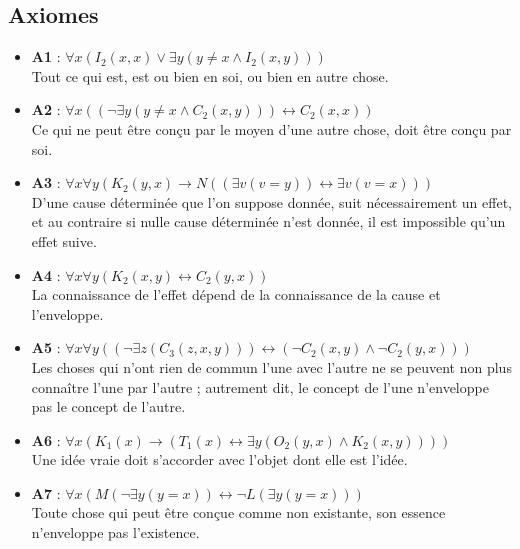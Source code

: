 \documentclass[10pt,a3paper]{article}
\begin{document}
\subsection{Axiomes}
\begin{itemize}
    \item \textbf{A1} : $\forall x (I_2(x,x) \lor \exists y (y \neq x \land I_2(x,y)))$ \\
    Tout ce qui est, est ou bien en soi, ou bien en autre chose.
    
    \item \textbf{A2} : $\forall x ((\neg \exists y (y \neq x \land C_2(x,y))) \leftrightarrow C_2(x,x))$ \\
    Ce qui ne peut être conçu par le moyen d’une autre chose, doit être conçu par soi.
    
    \item \textbf{A3} : $\forall x \forall y (K_2(y,x) \rightarrow N((\exists v (v = y)) \leftrightarrow \exists v (v = x)))$ \\
    D’une cause déterminée que l’on suppose donnée, suit nécessairement un effet, et au contraire si nulle cause déterminée n’est donnée, il est impossible qu’un effet suive.
    
    \item \textbf{A4} : $\forall x \forall y (K_2(x,y) \leftrightarrow C_2(y,x))$ \\
    La connaissance de l’effet dépend de la connaissance de la cause et l’enveloppe.
    
    \item \textbf{A5} : $\forall x \forall y ((\neg \exists z (C_3(z,x,y))) \leftrightarrow (\neg C_2(x,y) \land \neg C_2(y,x)))$ \\
    Les choses qui n’ont rien de commun l’une avec l’autre ne se peuvent non plus connaître l’une par l’autre ; autrement dit, le concept de l’une n’enveloppe pas le concept de l’autre.
    
    \item \textbf{A6} : $\forall x (K_1(x) \rightarrow (T_1(x) \leftrightarrow \exists y (O_2(y,x) \land K_2(x,y))))$ \\
    Une idée vraie doit s’accorder avec l’objet dont elle est l’idée.
    
    \item \textbf{A7} : $\forall x (M(\neg \exists y (y = x)) \leftrightarrow \neg L(\exists y (y = x)))$ \\
    Toute chose qui peut être conçue comme non existante, son essence n’enveloppe pas l’existence.
\end{itemize}    
\end{document}
